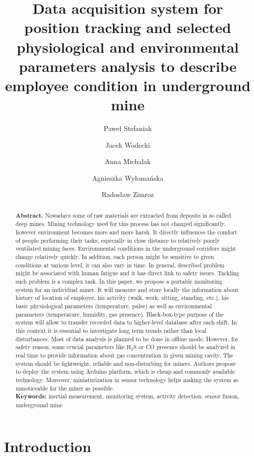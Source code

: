 \documentclass[10pt, a4paper]{article}
\title{\myfont \vspace{-5ex} Data acquisition system for position tracking and selected physiological and environmental parameters analysis to describe employee condition in underground mine}
\author[1]{\fontaut Pawe{\l} Stefaniak}
\author[1]{Jacek Wodecki}
\author[1]{Anna Michalak}
\author[1]{Agnieszka Wy{\l}oma{\'n}ska}
\author[1]{Rados{\l}aw Zimroz}
\affil[1]{\fontaf KGHM Cuprum Ltd, Research and Development Centre, Sikorskiego 2-8, 53-659 Wroclaw, Poland\\ \{pkstefaniak, jwodecki, amichalak, awylomanska, rzimroz\}@cuprum.wroc.pl  \newline \textbf{Email of Corresponding author: awylomanska@cuprum.wroc.pl}  }
\date{}
\newcommand*{\fontaf}{%
     \usefont{\encodingdefault}{\rmdefault}{n}{n}%
     \fontfamily{ptm}\fontsize{9}{10}%
     \selectfont}
\begin{document}
\maketitle  \thispagestyle{fancy} 

\begin{abstract}
    \fontaf \vspace{-5ex}
\textbf{Abstract.} Nowadays some of raw materials are extracted from deposits in so called deep mines. Mining technology used for this process has not changed significantly, however environment becomes more and more harsh. It directly influences the comfort of people performing their tasks, especially in close distance to relatively poorly ventilated mining faces. Environmental conditions in the underground corridors might change relatively quickly. In addition, each person might be sensitive to given conditions at various level, it can also vary in time. In general, described problem might be associated with human fatigue and it has direct link to safety issues. Tackling such problem is a complex task. In this paper, we propose a portable monitoring system for an individual miner. It will measure and store locally the information about history of location of employee, his activity (walk, work, sitting, standing, etc.), his basic physiological parameters (temperature, pulse) as well as environmental parameters (temperature, humidity, gas presence). Black-box-type purpose of the system will allow to transfer recorded data to higher-level database after each shift. In this context it is essential to investigate long term trends rather than local disturbances. Most of data analysis is planned to be done in offline mode. However, for safety reason, some crucial parameters like $\mathrm{H_2S}$ or CO presence should be analyzed in real time to provide information about gas concentration in given mining cavity. The system should be lightweight, reliable and non-disturbing for miners. Authors propose to deploy the system using Arduino platform, which is cheap and commonly available technology. Moreover, miniaturization in sensor technology helps making the system as unnoticeable for the miner as possible.\\
 
\textbf{Keywords:} inertial measurement, monitoring system, activity detection, sensor fusion, underground mine
\end{abstract}

\section{Introduction}
\end{document}
